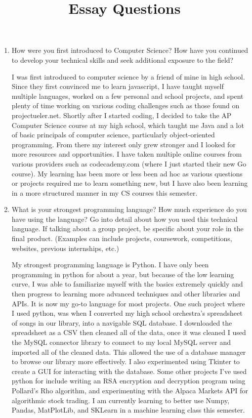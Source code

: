 \documentclass[10pt,a4paper]{article}
\title{Essay Questions}
\date{\vspace{-5ex}}
\begin{document}
\maketitle
\begin{enumerate}
  \item How were you first introduced to Computer Science? How have you continued to develop your technical skills and seek additional exposure to the field? \par \smallskip
  I was first introduced to computer science by a friend of mine in high school. Since they first convinced me to learn javascript, I have taught myself multiple languages, worked on a few personal and school projects, and spent plenty of time working on various coding challenges such as those found on projectueler.net. Shortly after I started coding, I decided to take the AP Computer Science course at my high school, which taught me Java and a lot of basic principals of computer science, particularly object-oriented programming. From there my interest only grew stronger and I looked for more resources and opportunities. I have taken multiple online courses from various providers such as codecademy.com (where I just started their new Go course). My learning has been more or less been ad hoc as various questions or projects required me to learn something new, but I have also been learning in a more structured manner in my CS courses this semester.

  \item What is your strongest programming language? How much experience do you have using the language? Go into detail about how you used this technical language. If talking about a group project, be specific about your role in the final product. (Examples can include projects, coursework, competitions, websites, previous internships, etc.) \par \smallskip
  My strongest programming language is Python. I have only been programming in python for about a year, but because of the low learning curve, I was able to familiarize myself with the basics extremely quickly and then progress to learning more advanced techniques and other libraries and APIs. It is now my go-to language for most projects. One such project where I used python, was when I converted my high school orchestra’s spreadsheet of songs in our library, into a navigable SQL database. I downloaded the spreadsheet as a CSV then cleaned all of the data, once it was cleaned I used the MySQL connector library to connect to my local MySQL server and imported all of the cleaned data. This allowed the use of a database manager to browse our library more effectively. I also experimented using Tkinter to create a GUI for interacting with the database. Some other projects I’ve used python for include writing an RSA encryption and decryption program using Pollard’s Rho algorithm, and experimenting with the Alpaca Markets API for algorithmic stock trading. I am currently learning to better use Numpy, Pandas, MatPlotLib, and SKLearn in a machine learning class this semester.


\end{enumerate}
\end{document}
